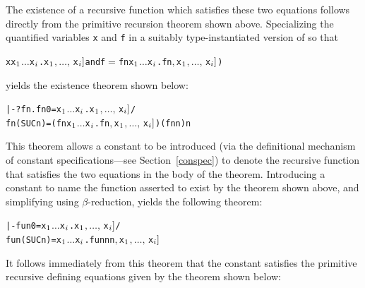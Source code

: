 The existence  of  a  recursive  function   which  satisfies these two
equations follows directly from the primitive recursion theorem
 shown above.   Specializing the  quantified variables \verb!x!
and \verb!f!  in  a suitably  type-instantiated version  of  so
that

\begin{hol}
\begin{alltt}
   x\m{=}\bs{}x\(\sb{1}\) \(\dots\) x\(\sb{i}\).\m{f\sb{1}[}x\(\sb{1}\)\(,\ldots,\,\)x\(\sb{i}]\)  {\rm and}  f\(=\)\bs{}f n x\(\sb{1}\) \(\dots\) x\(\sb{i}\).\m{f\sb{2}[}f  n\(,\) x\(\sb{1}\)\(,\ldots,\,\)x\(\sb{i}]\))
\end{alltt}
\end{hol}

\noindent yields the existence theorem shown below:

\begin{hol}
\begin{alltt}
   |- ?fn. fn 0       = \bs{}x\(\sb{1}\) \(\dots\) x\(\sb{i}\).\m{f\sb{1}[}x\(\sb{1}\)\(,\ldots,\,\)x\(\sb{i}]\) /\bs{}
           fn (SUC n) = (\bs{}f n x\(\sb{1}\) \(\dots\) x\(\sb{i}\).\m{f\sb{2}[}f  n\(,\) x\(\sb{1}\)\(,\ldots,\,\)x\(\sb{i}]\)) (fn n) n
\end{alltt}
\end{hol}

\noindent This theorem allows a constant  to be introduced (via the
definitional mechanism of constant specifications---see Section~\ref{conspec})
to denote the recursive function that satisfies the two equations in the body
of the theorem. Introducing a constant  to name the function asserted
to exist by the theorem shown above, and simplifying using $\beta$-reduction,
yields the following theorem:

\begin{hol}
\begin{alltt}
   |- fun 0       = \bs{}x\(\sb{1}\) \(\dots\) x\(\sb{i}\).\m{f\sb{1}[}x\(\sb{1}\)\(,\ldots,\,\)x\(\sb{i}]\) /\bs{}
      fun (SUC n) = \bs{}x\(\sb{1}\) \(\dots\) x\(\sb{i}\).\m{f\sb{2}[}fun n  n\(,\) x\(\sb{1}\)\(,\ldots,\,\)x\(\sb{i}]\)
\end{alltt}
\end{hol}

\noindent It follows immediately from this theorem that the constant 
satisfies the primitive recursive defining equations given by the theorem shown
below:

